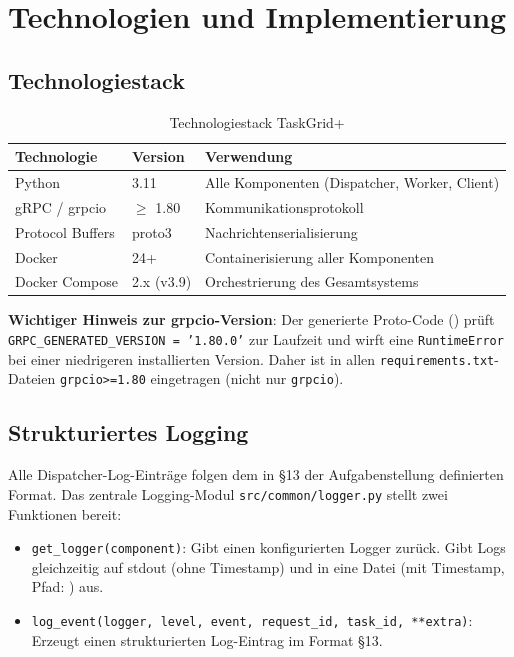 \section{Technologien und Implementierung}
\label{sec:technologien}

\subsection{Technologiestack}

\begin{table}[H]
\centering
\begin{tabular}{lll}
\toprule
\textbf{Technologie} & \textbf{Version} & \textbf{Verwendung} \\
\midrule
Python            & 3.11            & Alle Komponenten (Dispatcher, Worker, Client) \\
gRPC / grpcio     & $\geq$ 1.80     & Kommunikationsprotokoll \\
Protocol Buffers  & proto3          & Nachrichtenserialisierung \\
Docker            & 24+             & Containerisierung aller Komponenten \\
Docker Compose    & 2.x (v3.9)      & Orchestrierung des Gesamtsystems \\
\bottomrule
\end{tabular}
\caption{Technologiestack TaskGrid+}
\end{table}

\textbf{Wichtiger Hinweis zur grpcio-Version}:
Der generierte Proto-Code () prüft
\texttt{GRPC\_GENERATED\_VERSION = '1.80.0'} zur Laufzeit und
wirft eine \texttt{RuntimeError} bei einer niedrigeren installierten Version.
Daher ist in allen \texttt{requirements.txt}-Dateien \texttt{grpcio>=1.80}
eingetragen (nicht nur \texttt{grpcio}).

\subsection{Strukturiertes Logging}

Alle Dispatcher-Log-Einträge folgen dem in §13 der Aufgabenstellung
definierten Format.
Das zentrale Logging-Modul \texttt{src/common/logger.py}
stellt zwei Funktionen bereit:

\begin{itemize}
  \item \texttt{get\_logger(component)}: Gibt einen konfigurierten Logger zurück.
        Gibt Logs gleichzeitig auf stdout (ohne Timestamp) und in eine Datei
        (mit Timestamp, Pfad: ) aus.
  \item \texttt{log\_event(logger, level, event, request\_id, task\_id, **extra)}:
        Erzeugt einen strukturierten Log-Eintrag im Format §13.
\end{itemize}


